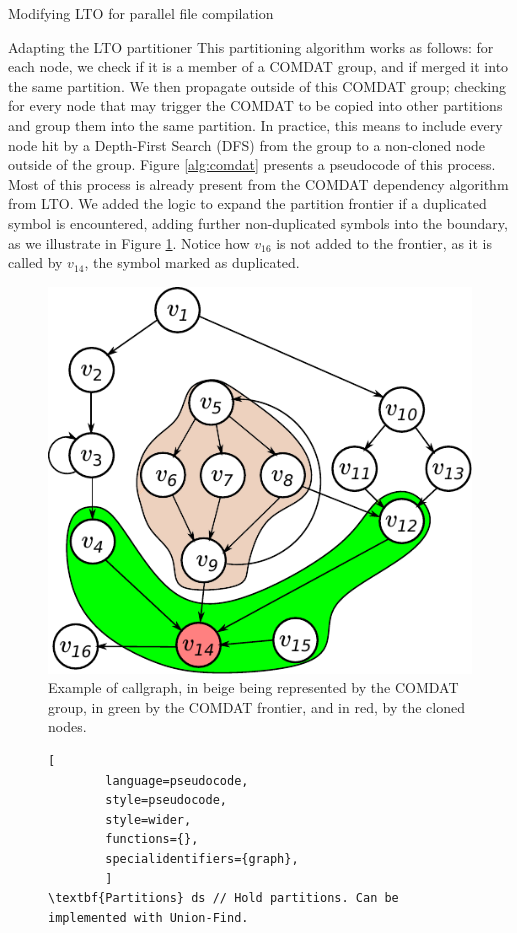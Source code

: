 \begin{section}{Modifying LTO for parallel file compilation}
\begin{subsection}{Adapting the LTO partitioner}
This partitioning algorithm works as follows: for each node, we check if it is
a member of a COMDAT \citep{comdat} group, and if merged it into the same
partition. We then propagate outside of this COMDAT group; checking for every
node that may trigger the COMDAT to be copied into other partitions and group
them into the same partition. In practice, this means to include every node hit
by a Depth-First Search (DFS) from the group to a non-cloned node outside of
the group.  Figure \ref{alg:comdat} presents a pseudocode of this process.
Most of this process is already present from the COMDAT dependency algorithm
from LTO.  We added the logic to expand the partition frontier if a duplicated
symbol is encountered, adding further non-duplicated symbols into
the boundary, as we illustrate in Figure \ref{fig:comdat_frontier}. Notice how
$v_{16}$ is not added to the frontier, as it is called by $v_{14}$, the symbol marked
as duplicated.

\begin{figure}
\centering
	 \includegraphics[scale=0.7]{figuras/comdat_frontier.pdf}
	  \caption{Example of callgraph, in beige being represented by the COMDAT group,
	  in green by the COMDAT frontier, and in red, by the cloned nodes.}
	  \label{fig:comdat_frontier}
\end{figure}


\begin{figure}[ht]
	\begin{center}
	\begin{lstlisting}[
		language=pseudocode,
		style=pseudocode,
		style=wider,
		functions={},
		specialidentifiers={graph},
		]
\textbf{Partitions} ds // Hold partitions. Can be implemented with Union-Find.


\end{lstlisting}
\end{center}
\end{figure}
\end{subsection}
\end{section}

